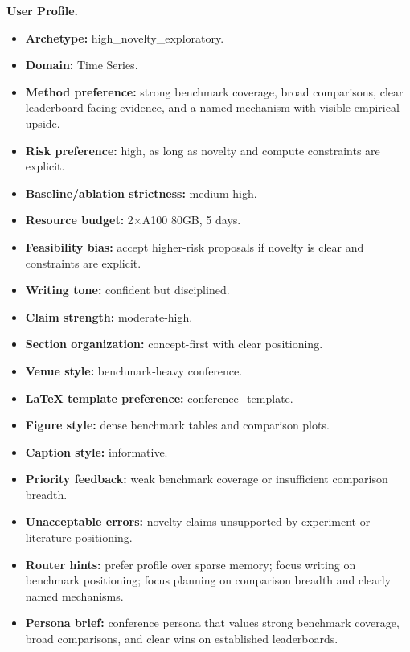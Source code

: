 \documentclass{opendatalab}
\begin{document}
\begin{tcolorbox}[
  breakable,
  colback=green!3,
  colframe=green!50!black,
  boxrule=0.5pt,
  arc=2pt,
  left=6pt, right=6pt, top=6pt, bottom=6pt,
  title=\textbf{Profile C: Benchmark-Driven Exploratory Researcher},
  fonttitle=\small\bfseries
]
\small
\textbf{User Profile.}
\begin{itemize}\setlength\itemsep{1pt}
  \item \textbf{Archetype:} high\_novelty\_exploratory.
  \item \textbf{Domain:} Time Series.
  \item \textbf{Method preference:} strong benchmark coverage, broad comparisons, clear leaderboard-facing evidence, and a named mechanism with visible empirical upside.
  \item \textbf{Risk preference:} high, as long as novelty and compute constraints are explicit.
  \item \textbf{Baseline/ablation strictness:} medium-high.
  \item \textbf{Resource budget:} 2$\times$A100 80GB, 5 days.
  \item \textbf{Feasibility bias:} accept higher-risk proposals if novelty is clear and constraints are explicit.
  \item \textbf{Writing tone:} confident but disciplined.
  \item \textbf{Claim strength:} moderate-high.
  \item \textbf{Section organization:} concept-first with clear positioning.
  \item \textbf{Venue style:} benchmark-heavy conference.
  \item \textbf{LaTeX template preference:} conference\_template.
  \item \textbf{Figure style:} dense benchmark tables and comparison plots.
  \item \textbf{Caption style:} informative.
  \item \textbf{Priority feedback:} weak benchmark coverage or insufficient comparison breadth.
  \item \textbf{Unacceptable errors:} novelty claims unsupported by experiment or literature positioning.
  \item \textbf{Router hints:} prefer profile over sparse memory; focus writing on benchmark positioning; focus planning on comparison breadth and clearly named mechanisms.
  \item \textbf{Persona brief:} conference persona that values strong benchmark coverage, broad comparisons, and clear wins on established leaderboards.
\end{itemize}


\end{tcolorbox}
\end{document}
